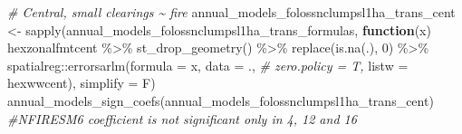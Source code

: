 \documentclass[10pt,landscape,a3paper]{article}
\newenvironment{Shaded}{\begin{snugshade}}{\end{snugshade}}
\newcommand{\AttributeTok}[1]{\textcolor[rgb]{0.77,0.63,0.00}{#1}}
\newcommand{\CommentTok}[1]{\textcolor[rgb]{0.56,0.35,0.01}{\textit{#1}}}
\newcommand{\ControlFlowTok}[1]{\textcolor[rgb]{0.13,0.29,0.53}{\textbf{#1}}}
\newcommand{\DecValTok}[1]{\textcolor[rgb]{0.00,0.00,0.81}{#1}}
\newcommand{\FunctionTok}[1]{\textcolor[rgb]{0.00,0.00,0.00}{#1}}
\newcommand{\NormalTok}[1]{#1}
\newcommand{\OtherTok}[1]{\textcolor[rgb]{0.56,0.35,0.01}{#1}}
\newcommand{\SpecialCharTok}[1]{\textcolor[rgb]{0.00,0.00,0.00}{#1}}
\begin{document}
\begin{Shaded}
\begin{Highlighting}[]
\CommentTok{\# Central, small clearings \textasciitilde{} fire}
\NormalTok{annual\_models\_folossnclumpsl1ha\_trans\_cent }\OtherTok{\textless{}{-}} \FunctionTok{sapply}\NormalTok{(annual\_models\_folossnclumpsl1ha\_trans\_formulas,}
                        \ControlFlowTok{function}\NormalTok{(x)}
\NormalTok{                          hexzonalfmtcent }\SpecialCharTok{\%\textgreater{}\%}
                          \FunctionTok{st\_drop\_geometry}\NormalTok{() }\SpecialCharTok{\%\textgreater{}\%}
                          \FunctionTok{replace}\NormalTok{(}\FunctionTok{is.na}\NormalTok{(.), }\DecValTok{0}\NormalTok{) }\SpecialCharTok{\%\textgreater{}\%}
\NormalTok{                          spatialreg}\SpecialCharTok{::}\FunctionTok{errorsarlm}\NormalTok{(}\AttributeTok{formula =}\NormalTok{ x,}
                                                 \AttributeTok{data =}\NormalTok{ ., }\CommentTok{\# zero.policy = T,}
                                                 \AttributeTok{listw =}\NormalTok{ hexwwcent),}
                        \AttributeTok{simplify =}\NormalTok{ F)}
\FunctionTok{annual\_models\_sign\_coefs}\NormalTok{(annual\_models\_folossnclumpsl1ha\_trans\_cent) }\CommentTok{\#NFIRESM6 coefficient is not significant only in 4, 12 and 16}


\end{Highlighting}
\end{Shaded}
\end{document}
